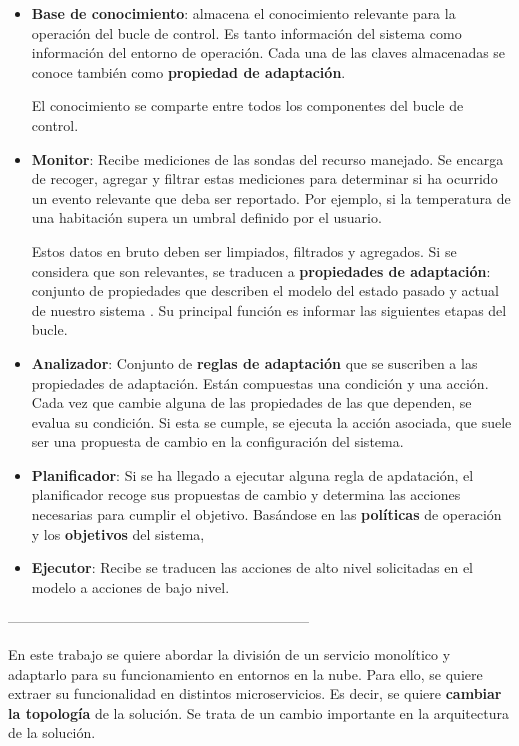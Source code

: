 \begin{itemize}
  \item \textbf{Base de conocimiento}: almacena el conocimiento relevante para la operación del bucle de control. Es tanto información del sistema como información del entorno de operación. Cada una de las claves almacenadas se conoce también como \textbf{propiedad de adaptación}.

  El conocimiento se comparte entre todos los componentes del bucle de control.

  \item \textbf{Monitor}: Recibe mediciones de las sondas del recurso manejado. Se encarga de recoger, agregar y filtrar estas mediciones para determinar si ha ocurrido un evento relevante que deba ser reportado. Por ejemplo, si la temperatura de una habitación supera un umbral definido por el usuario.

  Estos datos en bruto deben ser limpiados, filtrados y agregados. Si se considera que son relevantes, se traducen a \textbf{propiedades de adaptación}: conjunto de propiedades que describen el modelo del estado pasado y actual de nuestro sistema \cite{garlanIncreasingSystemDependability2003}. Su principal función es informar las siguientes etapas del bucle.


  \item \textbf{Analizador}: Conjunto de \textbf{reglas de adaptación} que se suscriben a las propiedades de adaptación. Están compuestas una condición y una acción. Cada vez que cambie alguna de las propiedades de las que dependen, se evalua su condición. Si esta se cumple, se ejecuta la acción asociada, que suele ser una propuesta de cambio en la configuración del sistema.

  \item \textbf{Planificador}: Si se ha llegado a ejecutar alguna regla de apdatación, el planificador recoge sus propuestas de cambio y determina las acciones necesarias para cumplir el objetivo. Basándose en las \textbf{políticas} de operación y los \textbf{objetivos} del sistema,

  \item \textbf{Ejecutor}: Recibe se traducen las acciones de alto nivel solicitadas en el modelo a acciones de bajo nivel.
\end{itemize}


-----------------------------------------------------------------

En este trabajo se quiere abordar la división de un servicio monolítico y adaptarlo para su funcionamiento en entornos en la nube. Para ello, se quiere extraer su funcionalidad en distintos microservicios. Es decir, se quiere \textbf{cambiar la topología} de la solución. Se trata de un cambio importante en la arquitectura de la solución.


